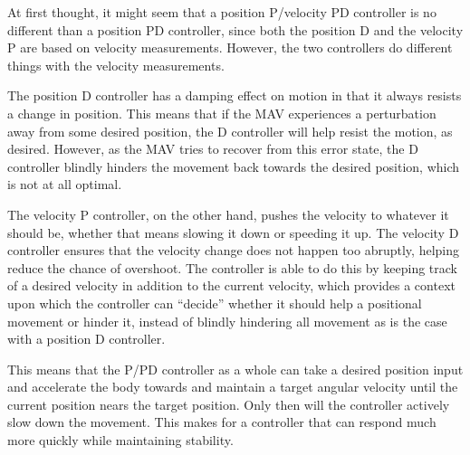 \documentclass[12pt,letterpaper]{article}
\begin{document}
At first thought, it might seem that a position P/velocity PD controller is no
different than a position PD controller, since both the position D and the
velocity P are based on velocity measurements. However, the two controllers do
different things with the velocity measurements.

The position D controller has a damping effect on motion in that it always
resists a change in position. This means that if the MAV experiences a
perturbation away from some desired position, the D controller will help resist
the motion, as desired. However, as the MAV tries to recover from this error
state, the D controller blindly hinders the movement back towards the desired
position, which is not at all optimal.

The velocity P controller, on the other hand, pushes the velocity to whatever
it should be, whether that means slowing it down or speeding it up. The
velocity D controller ensures that the velocity change does not happen too
abruptly, helping reduce the chance of overshoot. The controller is able to do
this by keeping track of a desired velocity in addition to the current
velocity, which provides a context upon which the controller can ``decide''
whether it should help a positional movement or hinder it, instead of blindly
hindering all movement as is the case with a position D controller.

This means that the P/PD controller as a whole can take a desired position
input and accelerate the body towards and maintain a target angular velocity
until the current position nears the target position. Only then will the
controller actively slow down the movement. This makes for a controller that
can respond much more quickly while maintaining stability.
\end{document}
